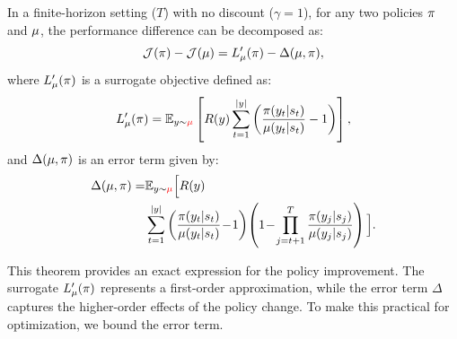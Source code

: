\begin{theorem}  
\label{lem:llm_identity} 
In a finite-horizon setting ($T$) with no discount ($\gamma=1$), for any two policies $\trainerpi$ and $\rolloutpi$, the performance difference can be decomposed as:  
\[
\mathcal{J}(\trainerpi) - \mathcal{J}(\rolloutpi) = L_{\rolloutpi}'(\trainerpi) - \Delta(\rolloutpi, \trainerpi),
\]
where $L_{\rolloutpi}'(\trainerpi)$ is a surrogate objective defined as:  
\begin{equation}  
L_{\rolloutpi}'(\trainerpi) = \mathbb{E}_{y \sim \redmu} \left[ R(y) \sum_{t=1}^{|y|} \left( \frac{\trainerpi(y_t|s_t)}{\rolloutpi(y_t|s_t)} - 1 \right) \right],  
\label{eq:llm_surrogate}  
\end{equation}  
and $\Delta(\rolloutpi, \trainerpi)$ is an error term given by:  
\begin{align} 
\Delta(\rolloutpi, \trainerpi) =& \mathbb{E}_{y \sim \redmu} \Big[ R(y) \\
& \sum_{t=1}^{|y|} \left( \frac{\trainerpi(y_t|s_t)}{\rolloutpi(y_t|s_t)} \!-\! 1 \right) \! \left( 1 \!-\! \prod_{j=t+1}^{T} \frac{\trainerpi(y_j|s_j)}{\rolloutpi(y_j|s_j)} \right) \Big]. \nonumber
\end{align} 
\end{theorem}  
This theorem provides an exact expression for the policy improvement. The surrogate $L_{\rolloutpi}'(\trainerpi)$ represents a first-order approximation, while the error term $\Delta$ captures the higher-order effects of the policy change. To make this practical for optimization, we bound the error term.  
  
